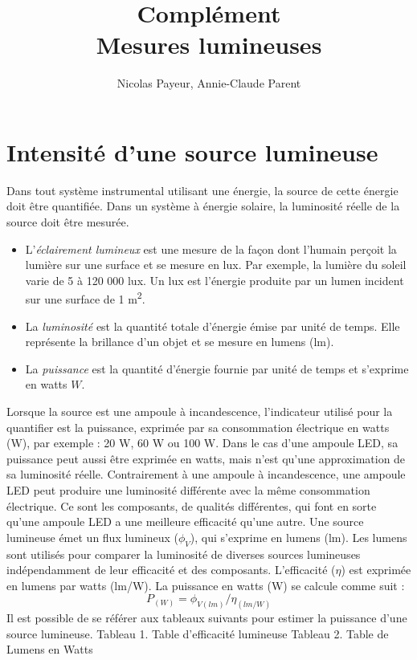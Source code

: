 \documentclass[12pt,oneside,letterpaper]{article}
\begin{document}
\title{\textbf{Complément}\\Mesures lumineuses}
\author{Nicolas Payeur, Annie-Claude Parent}
\date{}
\maketitle


\section{Intensité d'une source lumineuse}

Dans tout système instrumental utilisant une énergie, la source de cette énergie doit être quantifiée. Dans un système à énergie solaire, la luminosité réelle de la source doit être mesurée. 

\begin{itemize}
\item L'\textit{éclairement lumineux} est une mesure de la façon dont l'humain perçoit la lumière sur une surface et se mesure en lux. Par exemple, la lumière du soleil varie de 5 à 120 000 lux. Un lux est l'énergie produite par un lumen incident sur une surface de 1 m\textsuperscript{2}. 
\item La \textit{luminosité} est la quantité totale d'énergie émise par unité de temps. Elle représente la brillance d'un objet et se mesure en lumens (lm). 
\item La \textit{puissance} est la quantité d'énergie fournie par unité de temps et s'exprime en watts $W$. 
\end{itemize}

Lorsque la source est une ampoule à incandescence, l’indicateur utilisé pour la quantifier est la puissance, exprimée par sa consommation électrique en watts (W), par exemple : 20 W, 60 W ou 100 W. Dans le cas d’une ampoule LED, sa puissance peut aussi être exprimée en watts, mais n’est qu’une approximation de sa luminosité réelle. Contrairement à une ampoule à incandescence, une ampoule LED peut produire une luminosité différente avec la même consommation électrique. Ce sont les composants, de qualités différentes, qui font en sorte qu’une ampoule LED a une meilleure efficacité qu’une autre. 
Une source lumineuse émet un flux lumineux ($\phi_V$), qui s’exprime en lumens (lm). Les lumens sont utilisés pour comparer la luminosité de diverses sources lumineuses indépendamment de leur efficacité et des composants. L'efficacité ($\eta$) est exprimée en lumens par watts (lm/W). La puissance en watts (W) se calcule comme suit : 
\begin{equation}
P_{(W)}=\phi_{V(lm)}/\eta_{(lm/W)}		
\end{equation}
Il est possible de se référer aux tableaux suivants pour estimer la puissance d’une source lumineuse. 
Tableau 1. Table d’efficacité lumineuse
Tableau 2. Table de Lumens en Watts
\end{document}
